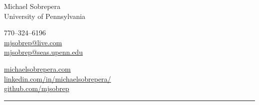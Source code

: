 \begin{center}
    {\LARGE Michael Sobrepera}\\[.5cm]
    University of Pennsylvania\\
    \begin{minipage}[c]{.35\textwidth}
    770--324--6196\\
    \href{mailto:mjsobrep@live.com}{mjsobrep@live.com}\\
    \href{mailto:mjsobrep@seas.upenn.edu}{mjsobrep@seas.upenn.edu}\\
    \end{minipage}
    \hspace{.28\textwidth}
    \begin{minipage}[r]{.35\textwidth}
    \raggedleft
    \href{http://michaelsobrepera.com}{michaelsobrepera.com}\\
    \href{https://www.linkedin.com/in/michaelsobrepera/}{linkedin.com/in/michaelsobrepera/}\\
    \href{https://github.com/mjsobrep}{github.com/mjsobrep}\\

    \end{minipage}
    \end{center}
    \hrule
    \vspace{.4cm}
